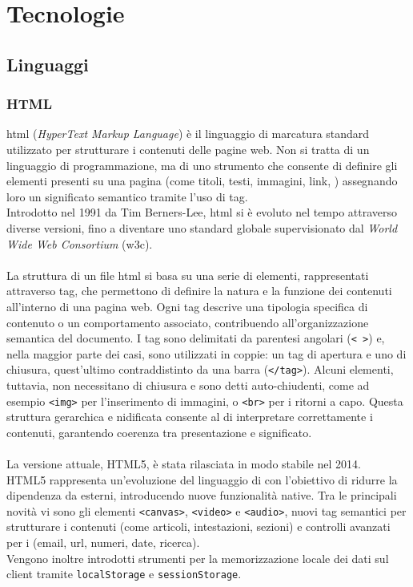 \chapter{Tecnologie}
\label{chap:linguaggi-tecnologie}

\section{Linguaggi}
\subsection{HTML}
\noindent \acrshort{html} (\textit{HyperText Markup Language}) è il linguaggio di marcatura standard utilizzato per strutturare i contenuti delle pagine web. Non si tratta di un linguaggio di programmazione, ma di uno strumento che consente di definire gli elementi presenti su una pagina (come titoli, testi, immagini, link, ) assegnando loro un significato semantico tramite l’uso di tag. \\
Introdotto nel 1991 da Tim Berners-Lee, \acrshort{html} si è evoluto nel tempo attraverso diverse versioni, fino a diventare uno standard globale supervisionato dal \textit{World Wide Web Consortium} (\acrshort{w3c}).\\
\\
La struttura di un file \acrshort{html} si basa su una serie di elementi, rappresentati attraverso tag, che permettono di definire la natura e la funzione dei contenuti all'interno di una pagina web. Ogni tag descrive una tipologia specifica di contenuto o un comportamento associato, contribuendo all'organizzazione semantica del documento. I tag sono delimitati da parentesi angolari (\texttt{< >}) e, nella maggior parte dei casi, sono utilizzati in coppie: un tag di apertura e uno di chiusura, quest’ultimo contraddistinto da una barra (\texttt{</tag>}). Alcuni elementi, tuttavia, non necessitano di chiusura e sono detti auto-chiudenti, come ad esempio \texttt{<img>} per l’inserimento di immagini, o \texttt{<br>} per i ritorni a capo. Questa struttura gerarchica e nidificata consente al  di interpretare correttamente i contenuti, garantendo coerenza tra presentazione e significato.\\
\\
La versione attuale, HTML5, è stata rilasciata in modo stabile nel 2014.\\
HTML5 rappresenta un’evoluzione del linguaggio di  con l’obiettivo di ridurre la dipendenza da  esterni, introducendo nuove funzionalità native. Tra le principali novità vi sono gli elementi \texttt{<canvas>}, \texttt{<video>} e \texttt{<audio>}, nuovi tag semantici per strutturare i contenuti (come articoli, intestazioni, sezioni) e controlli avanzati per i  (email, \acrshort{url}, numeri, date, ricerca). 
\\Vengono inoltre introdotti strumenti per la memorizzazione locale dei dati sul client tramite \texttt{localStorage} e \texttt{sessionStorage}.

